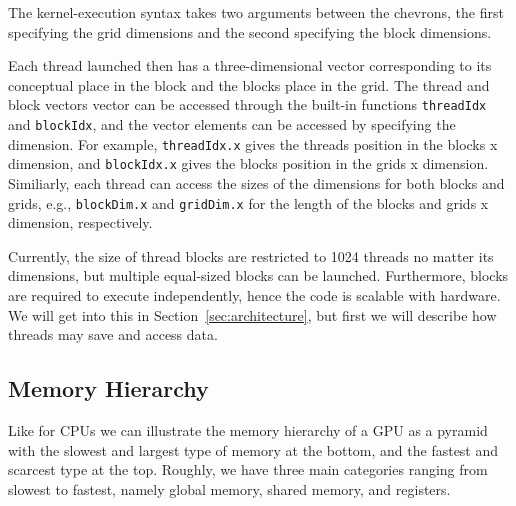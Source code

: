 The kernel-execution syntax takes two arguments between the
chevrons, the first specifying the grid dimensions and the
second specifying the block dimensions.

Each thread launched then has a three-dimensional vector
corresponding to its conceptual place in the block and the
blocks place in the grid. The thread and block vectors
vector can be accessed through the built-in functions
\texttt{threadIdx} and \texttt{blockIdx}, and the vector
elements can be accessed by specifying the dimension. For
example, \texttt{threadIdx.x} gives the threads position in
the blocks x dimension, and \texttt{blockIdx.x} gives the
blocks position in the grids x dimension. Similiarly, each
thread can access the sizes of the dimensions for both
blocks and grids, e.g., \texttt{blockDim.x} and
\texttt{gridDim.x} for the length of the blocks and grids x
dimension, respectively.

Currently, the size of thread blocks are restricted to 1024
threads no matter its dimensions, but multiple equal-sized
blocks can be launched. Furthermore, blocks are required to
execute independently, hence the code is scalable with
hardware. We will get into this in
Section~\ref{sec:architecture}, but first we will describe
how threads may save and access data.


\subsection{Memory Hierarchy}







Like for CPUs we can illustrate the memory hierarchy of a
GPU as a pyramid with the slowest and largest type of memory
at the bottom, and the fastest and scarcest type at the top.
Roughly, we have three main categories ranging from slowest
to fastest, namely global memory, shared memory, and
registers.

